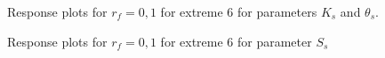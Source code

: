 \documentclass[review,times,3p,10pt]{elsarticle}
\begin{document}
\begin{figure}[htb!]
\label{ext6rf0-Kt}
\caption{Response plots for $r_f=0,1$ for extreme 6 for parameters $K_s$ and $\theta_s$. }
\end{figure}

\begin{figure}[htb!]
\label{ext6rf0-Ss}
\caption{Response plots for $r_f=0,1$ for extreme 6 for parameter $S_s$}
\end{figure}
\end{document}
